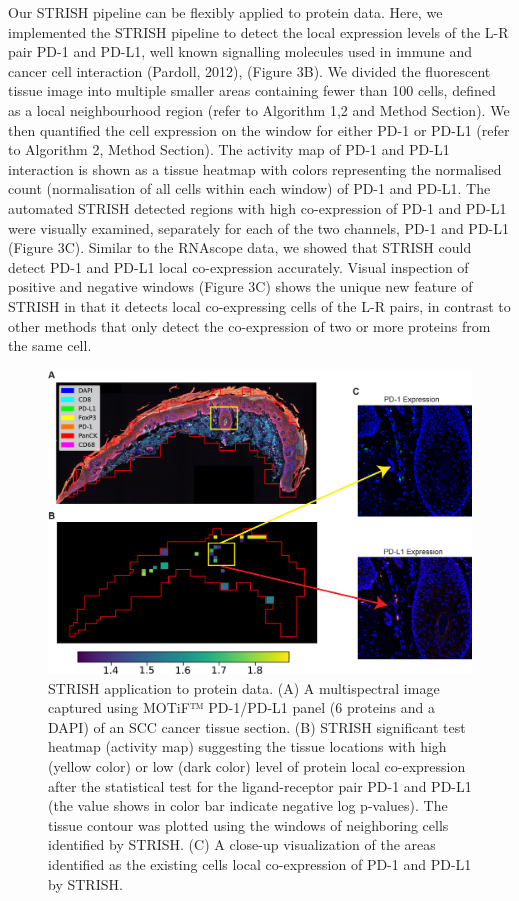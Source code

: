 Our STRISH pipeline can be flexibly applied to protein data. Here, we implemented the STRISH pipeline to detect the local expression levels of the L-R pair PD-1 and PD-L1, well known signalling molecules used in immune and cancer cell interaction (Pardoll, 2012), (Figure 3B). We divided the fluorescent tissue image into multiple smaller areas containing fewer than 100 cells, defined as a local neighbourhood region (refer to Algorithm 1,2 and Method Section). We then quantified the cell expression on the window for either PD-1 or PD-L1 (refer to Algorithm 2, Method Section). The activity map of PD-1 and PD-L1 interaction is shown as a tissue heatmap with colors representing the normalised count (normalisation of all cells within each window) of PD-1 and PD-L1. The automated STRISH detected regions with high co-expression of PD-1 and PD-L1 were visually examined, separately for each of the two channels, PD-1 and PD-L1 (Figure 3C). Similar to the RNAscope data, we showed that STRISH could detect PD-1 and PD-L1 local co-expression accurately. Visual inspection of positive and negative windows (Figure 3C) shows the unique new feature of STRISH in that it detects local co-expressing cells of the L-R pairs, in contrast to other methods that only detect the co-expression of two or more proteins from the same cell. 
\begin{figure}[htp]
    \centering
    \includegraphics[width=0.8\columnwidth]{Chapter2/Figures/Chapter2_Fig3.jpg}
    \caption{ STRISH application to protein data. (A) A multispectral image captured using MOTiF™ PD-1/PD-L1 panel (6 proteins and a DAPI) of an SCC cancer tissue section. (B) STRISH significant test heatmap (activity map) suggesting the tissue locations with high (yellow color) or low (dark color) level of protein local co-expression after the statistical test for the ligand-receptor pair PD-1 and PD-L1 (the value shows in color bar indicate negative log p-values). The tissue contour was plotted using the windows of neighboring cells identified by STRISH. (C) A close-up visualization of the areas identified as the existing cells local co-expression of PD-1 and PD-L1 by STRISH.}
    \label{fig:Chap2_figure3}
\end{figure}
